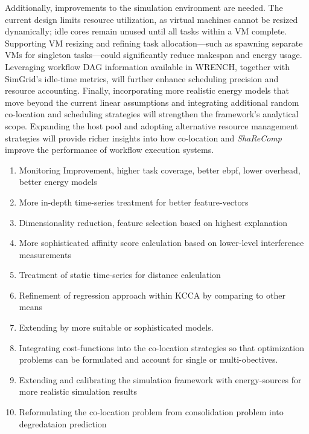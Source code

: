 Additionally, improvements to the simulation environment are needed. The current design limits resource utilization, as virtual machines cannot be resized dynamically; idle cores remain unused until all tasks within a VM complete. Supporting VM resizing and refining task allocation—such as spawning separate VMs for singleton tasks—could significantly reduce makespan and energy usage. Leveraging workflow DAG information available in WRENCH, together with SimGrid's idle-time metrics, will further enhance scheduling precision and resource accounting.
Finally, incorporating more realistic energy models that move beyond the current linear assumptions and integrating additional random co-location and scheduling strategies will strengthen the framework's analytical scope. Expanding the host pool and adopting alternative resource management strategies will provide richer insights into how co-location and \textit{ShaReComp} improve the performance of workflow execution systems.


\begin{enumerate}
    \item Monitoring Improvement, higher task coverage, better ebpf, lower overhead, better energy models
    \item More in-depth time-series treatment for better feature-vectors
    \item Dimensionality reduction, feature selection based on highest explanation
    \item More sophisticated affinity score calculation based on lower-level interference measurements
    \item Treatment of static time-series for distance calculation
    \item Refinement of regression approach within KCCA by comparing to other means
    \item Extending by more suitable or sophisticated models.
    \item Integrating cost-functions into the co-location strategies so that optimization problems can be formulated and account for single or multi-obectives.
    \item Extending and calibrating the simulation framework with energy-sources for more realistic simulation results
    \item Reformulating the co-location problem from consolidation problem into degredataion prediction

\end{enumerate}